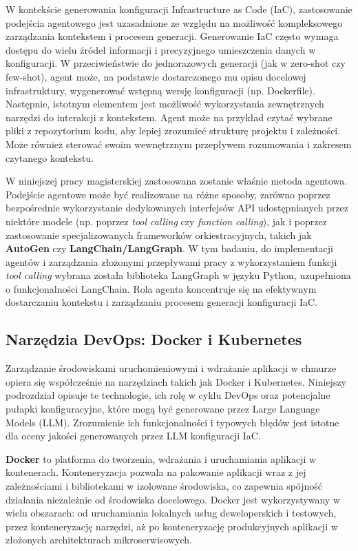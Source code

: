 W kontekście generowania konfiguracji Infrastructure as Code (IaC), zastosowanie podejścia agentowego jest uzasadnione ze względu na możliwość kompleksowego zarządzania kontekstem i procesem generacji. Generowanie IaC często wymaga dostępu do wielu źródeł informacji i precyzyjnego umieszczenia danych w konfiguracji. W przeciwieństwie do jednorazowych generacji (jak w zero-shot czy few-shot), agent może, na podstawie dostarczonego mu opisu docelowej infrastruktury, wygenerować wstępną wersję konfiguracji (np. Dockerfile). Następnie, istotnym elementem jest możliwość wykorzystania zewnętrznych narzędzi do interakcji z kontekstem. Agent może na przykład czytać wybrane pliki z repozytorium kodu, aby lepiej zrozumieć strukturę projektu i zależności. Może również sterować swoim wewnętrznym przepływem rozumowania i zakresem czytanego kontekstu.

W niniejszej pracy magisterskiej zastosowana zostanie właśnie metoda agentowa. Podejście agentowe może być realizowane na różne sposoby, zarówno poprzez bezpośrednie wykorzystanie dedykowanych interfejsów API udostępnianych przez niektóre modele (np. poprzez \textit{tool calling} czy \textit{function calling}), jak i poprzez zastosowanie specjalizowanych frameworków orkiestracyjnych, takich jak \textbf{AutoGen} czy \textbf{LangChain/LangGraph}. W tym badaniu, do implementacji agentów i zarządzania złożonymi przepływami pracy z wykorzystaniem funkcji \textit{tool calling} wybrana została biblioteka LangGraph w języku Python, uzupełniona o funkcjonalności LangChain. Rola agenta koncentruje się na efektywnym dostarczaniu kontekstu i zarządzaniu procesem generacji konfiguracji IaC.

\subsection{Narzędzia DevOps: Docker i Kubernetes}

Zarządzanie środowiskami uruchomieniowymi i wdrażanie aplikacji w chmurze opiera się współcześnie na narzędziach takich jak Docker i Kubernetes. Niniejszy podrozdział opisuje te technologie, ich rolę w cyklu DevOps oraz potencjalne pułapki konfiguracyjne, które mogą być generowane przez Large Language Models (LLM). Zrozumienie ich funkcjonalności i typowych błędów jest istotne dla oceny jakości generowanych przez LLM konfiguracji IaC.

\textbf{Docker} to platforma do tworzenia, wdrażania i uruchamiania aplikacji w kontenerach. Konteneryzacja pozwala na pakowanie aplikacji wraz z jej zależnościami i bibliotekami w izolowane środowiska, co zapewnia spójność działania niezależnie od środowiska docelowego. Docker jest wykorzystywany w wielu obszarach: od uruchamiania lokalnych usług deweloperskich i testowych, przez konteneryzację narzędzi, aż po konteneryzację produkcyjnych aplikacji w złożonych architekturach mikroserwisowych.


